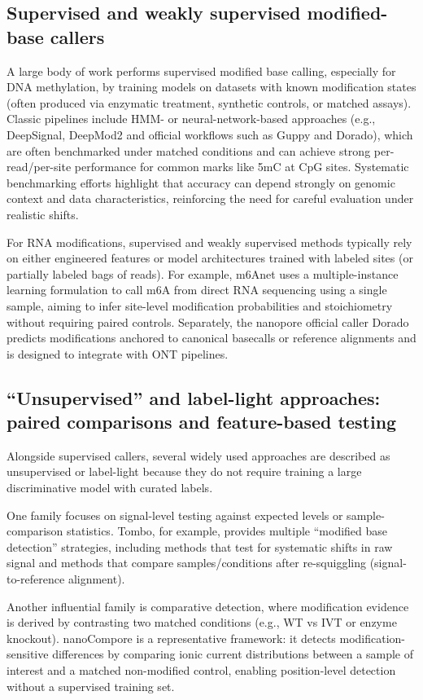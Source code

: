 \documentclass[sigconf, review]{acmart}
\begin{document}
\subsection{Supervised and weakly supervised modified-base callers}
A large body of work performs supervised modified base calling, especially for DNA methylation, by training models on datasets with known modification states (often produced via enzymatic treatment, synthetic controls, or matched assays). Classic pipelines include HMM- or neural-network-based approaches (e.g., DeepSignal\cite{ref2}, DeepMod2\cite{ref3} and official workflows such as Guppy and Dorado\cite{ref4}), which are often benchmarked under matched conditions and can achieve strong per-read/per-site performance for common marks like 5mC at CpG sites. Systematic benchmarking efforts highlight that accuracy can depend strongly on genomic context and data characteristics, reinforcing the need for careful evaluation under realistic shifts\cite{ref5}.

For RNA modifications, supervised and weakly supervised methods typically rely on either engineered features or model architectures trained with labeled sites (or partially labeled bags of reads). For example, m6Anet\cite{ref6} uses a multiple-instance learning formulation to call m6A from direct RNA sequencing using a single sample, aiming to infer site-level modification probabilities and stoichiometry without requiring paired controls. Separately, the nanopore official caller Dorado\cite{ref4} predicts modifications anchored to canonical basecalls or reference alignments and is designed to integrate with ONT pipelines.

\subsection{“Unsupervised” and label-light approaches: paired comparisons and feature-based testing}
Alongside supervised callers, several widely used approaches are described as unsupervised or label-light because they do not require training a large discriminative model with curated labels.

One family focuses on signal-level testing against expected levels or sample-comparison statistics. Tombo\cite{ref7}, for example, provides multiple “modified base detection” strategies, including methods that test for systematic shifts in raw signal and methods that compare samples/conditions after re-squiggling (signal-to-reference alignment).

Another influential family is comparative detection, where modification evidence is derived by contrasting two matched conditions (e.g., WT vs IVT or enzyme knockout). nanoCompore\cite{ref8} is a representative framework: it detects modification-sensitive differences by comparing ionic current distributions between a sample of interest and a matched non-modified control, enabling position-level detection without a supervised training set.
\end{document}
